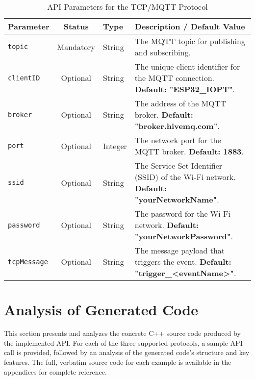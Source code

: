 \begin{table}[h!]
    \centering
    \caption{API Parameters for the TCP/MQTT Protocol}
    \label{tab:tcp_params}
    \begin{tabular}{|l|c|l|p{6cm}|}
        \hline
        \textbf{Parameter} & \textbf{Status} & \textbf{Type} & \textbf{Description / Default Value} \\ \hline
        \texttt{topic} & Mandatory & String & The MQTT topic for publishing and subscribing. \\ \hline
        \texttt{clientID} & Optional & String & The unique client identifier for the MQTT connection. \textbf{Default: "ESP32\_IOPT"}. \\ \hline
        \texttt{broker} & Optional & String & The address of the MQTT broker. \textbf{Default: "broker.hivemq.com"}. \\ \hline
        \texttt{port} & Optional & Integer & The network port for the MQTT broker. \textbf{Default: 1883}. \\ \hline
        \texttt{ssid} & Optional & String & The Service Set Identifier (SSID) of the Wi-Fi network. \textbf{Default: "yourNetworkName"}. \\ \hline
        \texttt{password} & Optional & String & The password for the Wi-Fi network. \textbf{Default: "yourNetworkPassword"}. \\ \hline
        \texttt{tcpMessage} & Optional & String & The message payload that triggers the event. \textbf{Default: "trigger\_<eventName>"}. \\ \hline
    \end{tabular}
\end{table}



\section{Analysis of Generated Code}
\label{sec:code_analysis}

This section presents and analyzes the concrete C++ source code produced by the implemented API. For each of the three supported protocols, a sample API call is provided, followed by an analysis of the generated code's structure and key features. The full, verbatim source code for each example is available in the appendices for complete reference.

